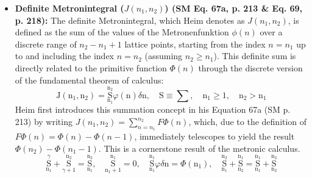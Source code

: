 \documentclass[12pt]{article}
\newcommand{\metrondifferential}{F} %
\newcommand{\metronenziffer}{n}
\begin{document}
\begin{itemize}
        \item \textbf{Definite Metronintegral (\( J(n_1, n_2) \)) (SM Eq. 67a, p. 213 \& Eq. 69, p. 218):}
    The definite Metronintegral, which Heim denotes as \( J(n_1, n_2) \), is defined as the sum of the values of the Metronenfunktion \( \phi(\metronenziffer) \) over a discrete range of \( n_2 - n_1 + 1 \) lattice points, starting from the index \( \metronenziffer = n_1 \) up to and including the index \( \metronenziffer = n_2 \) (assuming \( n_2 \geq n_1 \)). This definite sum is directly related to the primitive function \( \Phi(\metronenziffer) \) through the discrete version of the fundamental theorem of calculus:
    \begin{equation}
    \mathrm{J}(\mathrm{n_1}, \mathrm{n_2}) = \underset{\mathrm{n_1}}{\overset{\mathrm{n_2}}{\mathrm{S}}} \varphi(\mathrm{n}) \delta\mathrm{n}, \quad \mathrm{S} \equiv \sum, \quad \mathrm{n_1} \ge 1, \quad \mathrm{n_2} > \mathrm{n_1} \tag{67a}
    \label{eq:original_definite_metronintegral}
    \end{equation}
    Heim first introduces this summation concept in his Equation 67a (SM p. 213) by writing \( J(n_1, n_2) = \sum_{\metronenziffer=n_1}^{n_2} \metrondifferential\Phi(\metronenziffer) \), which, due to the definition of \( \metrondifferential\Phi(\metronenziffer) = \Phi(\metronenziffer) - \Phi(\metronenziffer-1) \), immediately telescopes to yield the result \( \Phi(n_2) - \Phi(n_1-1) \). This is a cornerstone result of the metronic calculus.
    \begin{equation}
    \underset{\mathrm{n_1}}{\overset{\gamma}{\mathrm{S}}} + \underset{\gamma+1}{\overset{\mathrm{n_2}}{\mathrm{S}}} = \underset{\mathrm{n_1}}{\overset{\mathrm{n_2}}{\mathrm{S}}}, \quad \underset{\mathrm{n_1+1}}{\overset{\mathrm{n_1}}{\mathrm{S}}} = 0, \quad \underset{\mathrm{n_1}}{\overset{\mathrm{n_1}}{\mathrm{S}}} \varphi \delta\mathrm{n} = \Phi(\mathrm{n_1}), \quad \underset{\mathrm{n_1}}{\overset{\mathrm{n_2}}{\mathrm{S}}} + \underset{\mathrm{n_2}}{\overset{\mathrm{n_1}}{\mathrm{S}}} = \underset{\mathrm{n_1}}{\overset{\mathrm{n_1}}{\mathrm{S}}} + \underset{\mathrm{n_2}}{\overset{\mathrm{n_2}}{\mathrm{S}}} \tag{69}
    \end{equation}


\end{itemize}
\end{document}

